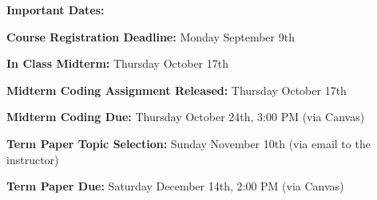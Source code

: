 \documentclass[12 point]{article}
\begin{document}
{\bf Important Dates:} 

\hspace{1cm} {\bf Course Registration Deadline:} Monday September 9th

\hspace{1cm} {\bf In Class Midterm: }  Thursday October 17th

\hspace{1cm} {\bf Midterm Coding Assignment Released:} Thursday October 17th

\hspace{1cm} {\bf Midterm Coding Due: } Thursday October 24th, 3:00 PM (via Canvas)
 
\hspace{1cm} {\bf Term Paper Topic Selection: } Sunday November 10th (via email to the instructor) 
 
\hspace{1cm} {\bf Term Paper Due: }  Saturday December 14th, 2:00 PM (via Canvas)
\end{document}
